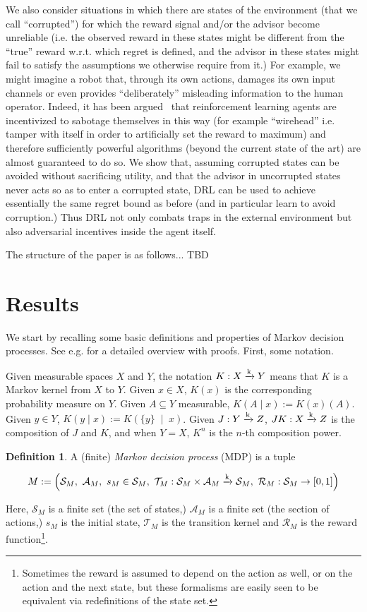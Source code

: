 \documentclass[11pt]{article}
\theoremstyle{definition}
\newtheorem{definition}{Definition}%
\theoremstyle{plain}
\newcommand{\AP}[1]{\left(#1\right)}
\newcommand{\APM}[2]{\left(#1\;\middle\vert\;#2\right)}
\newcommand{\K}{\xrightarrow{\textnormal{k}}}
\newcommand{\A}{\mathcal{A}}
\newcommand{\St}{\mathcal{S}}
\newcommand{\T}{\mathcal{T}}
\newcommand{\R}{\mathcal{R}}
\begin{document}
We also consider situations in which there are states of the environment (that we call \enquote{corrupted}) for which the reward signal and/or the advisor become unreliable (i.e. the observed reward in these states might be different from the \enquote{true} reward w.r.t. which regret is defined, and the advisor in these states might fail to satisfy the assumptions we otherwise require from it.) For example, we might imagine a robot that, through its own actions, damages its own input channels or even provides \enquote{deliberately} misleading information to the human operator. Indeed, it has been argued~\cite{TBD} that reinforcement learning agents are incentivized to sabotage themselves in this way (for example \enquote{wirehead} i.e. tamper with itself in order to artificially set the reward to maximum) and therefore sufficiently powerful algorithms (beyond the current state of the art) are almost guaranteed to do so. We show that, assuming corrupted states can be avoided without sacrificing utility, and that the advisor in uncorrupted states never acts so as to enter a corrupted state, DRL can be used to achieve essentially the same regret bound as before (and in particular learn to avoid corruption.) Thus DRL not only combats traps in the external environment but also adversarial incentives inside the agent itself.

The structure of the paper is as follows... TBD

\section{Results}

We start by recalling some basic definitions and properties of Markov decision processes. See e.g. \cite{Feinberg2002} for a detailed overview with proofs. First, some notation. 

Given measurable spaces $X$ and $Y$, the notation $K: X \K Y$ means that $K$ is a Markov kernel from $X$ to $Y$. Given $x \in X$, $K(x)$ is the corresponding probability measure on $Y$. Given $A \subseteq Y$ measurable, $K(A \mid x) := K(x)(A)$. Given $y \in Y$, $K(y \mid x):=K\APM{\{y\}}{x}$. Given $J: Y \K Z$, $JK: X \K Z$ is the composition of $J$ and $K$, and when $Y = X$, $K^n$ is the $n$-th composition power.

\begin{samepage}
\begin{definition}

A (finite) \emph{Markov decision process} (MDP) is a tuple

$$M:=\AP{\St_M,\ \A_M,\ s_M\in \St_M,\ \T_M: \St_M \times \A_M \K \St_M,\ \R_M: \St_M \rightarrow [0,1]}$$

Here, $\St_M$ is a finite set (the set of states,) $\A_M$ is a finite set (the section of actions,) $s_M$ is the initial state, $\T_M$ is the transition kernel and $\R_M$ is the reward function\footnote{Sometimes the reward is assumed to depend on the action as well, or on the action and the next state, but these formalisms are easily seen to be equivalent via redefinitions of the state set.}.

\end{definition}
\end{samepage}
\end{document}
